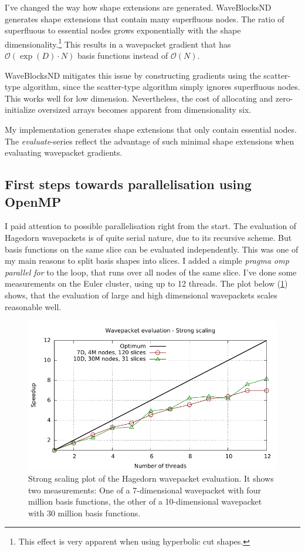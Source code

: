 \documentclass{article}
\begin{document}
I've changed the way how shape extensions are generated. WaveBlocksND generates
shape extensions that contain many superfluous nodes. The ratio of superfluous to
essential nodes grows exponentially with the shape
dimensionality.\footnote{This effect is very apparent when using hyperbolic cut shapes.}
This results in a wavepacket gradient that has \(\mathcal{O}(\exp{}(D)\cdot N)\) basis functions instead of
\(\mathcal{O}(N)\).

WaveBlocksND mitigates this issue by constructing gradients using the scatter-type algorithm,
since the scatter-type algorithm simply ignores superfluous nodes. This works well for low dimension.
Nevertheless, the cost of allocating and zero-initialize oversized arrays
becomes apparent from dimensionality six.

My implementation generates shape extensions that only contain essential nodes.
The \emph{evaluate}-series reflect the advantage of such minimal shape extensions
when evaluating wavepacket gradients.

\subsection{First steps towards parallelisation using OpenMP}

I paid attention to possible parallelisation right from the start.
The evaluation of Hagedorn wavepackets is of quite serial nature, due to its
recursive scheme. But basis functions on the same slice can be evaluated independently.
This was one of my main reasons to split basis shapes into slices.
I added a simple \emph{pragma omp parallel for} to the loop, that runs over all nodes
of the same slice. I've done some measurements on the Euler cluster, using up to 12 threads.
The plot below (\ref{fig:hawp_eval_omp}) shows, that the evaluation of large and high dimensional
wavepackets scales reasonable well.

\begin{figure}[H]
  \centering
  \includegraphics[width=1.0\textwidth]{plots/hawp_eval_omp}
  \caption{
    Strong scaling plot of the Hagedorn wavepacket evaluation.
    It shows two measurements: One of a 7-dimensional wavepacket with
    four million basis functions, the other of a 10-dimensional wavepacket with
    30 million basis functions.
  }
  \label{fig:hawp_eval_omp}
\end{figure}
\end{document}
